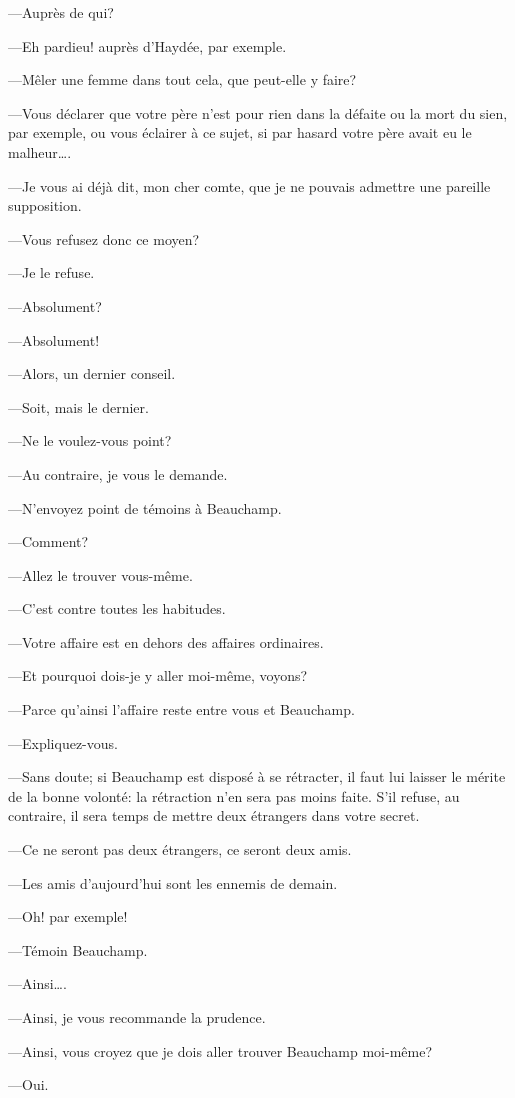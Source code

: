 —Auprès de qui? 

—Eh pardieu! auprès d'Haydée, par exemple. 

—Mêler une femme dans tout cela, que peut-elle y faire? 

—Vous déclarer que votre père n'est pour rien dans la défaite ou la mort du sien, par exemple, ou vous éclairer à ce sujet, si par hasard votre père avait eu le malheur\dots. 

—Je vous ai déjà dit, mon cher comte, que je ne pouvais admettre une pareille supposition. 

—Vous refusez donc ce moyen?  

—Je le refuse. 

—Absolument? 

—Absolument! 

—Alors, un dernier conseil. 

—Soit, mais le dernier. 

—Ne le voulez-vous point? 

—Au contraire, je vous le demande. 

—N'envoyez point de témoins à Beauchamp. 

—Comment? 

—Allez le trouver vous-même. 

—C'est contre toutes les habitudes. 

—Votre affaire est en dehors des affaires ordinaires. 

—Et pourquoi dois-je y aller moi-même, voyons? 

—Parce qu'ainsi l'affaire reste entre vous et Beauchamp. 

—Expliquez-vous. 

—Sans doute; si Beauchamp est disposé à se rétracter, il faut lui laisser le mérite de la bonne volonté: la rétraction n'en sera pas moins faite. S'il refuse, au contraire, il sera temps de mettre deux étrangers dans votre secret. 

—Ce ne seront pas deux étrangers, ce seront deux amis. 

—Les amis d'aujourd'hui sont les ennemis de demain. 

—Oh! par exemple! 

—Témoin Beauchamp. 

—Ainsi\dots. 

—Ainsi, je vous recommande la prudence. 

—Ainsi, vous croyez que je dois aller trouver Beauchamp moi-même? 

—Oui. 

